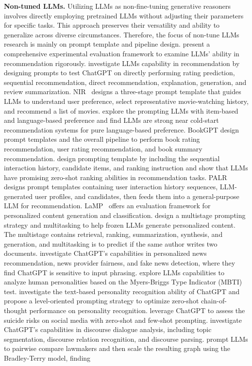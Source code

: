 \documentclass[11pt]{article}
\renewcommand\paragraph[1]{\vspace{0.05in} \noindent \textbf{#1.}}
\begin{document}
\paragraph{Non-tuned LLMs}
Utilizing LLMs as non-fine-tuning generative reasoners involves directly employing pretrained LLMs without adjusting their parameters for specific tasks. This approach preserves their versatility and ability to generalize across diverse circumstances. Therefore, the focus of non-tune LLMs research is mainly on prompt template and pipeline design.
\citet{di2023evaluating} present a comprehensive experimental evaluation framework to examine LLMs' ability in recommendation rigorously. \citet{liu2023chatgpt} investigate LLMs capability in recommendation by designing prompts to test ChatGPT on directly performing rating prediction, sequential recommendation, direct recommendation, explanation, generation, and review summarization. NIR~\cite{wang2023zero} designs a three-stage prompt template that guides LLMs to understand user preference, select representative movie-watching history, and recommend a list of movies. \citet{sanner2023large} explore the prompting LLMs with item-based and language-based preference and find LLMs are strong near cold-start recommendation systems for pure language-based preference. BookGPT \cite{zhiyuli2023bookgpt} design prompt templates and the overall pipeline to perform book rating recommendation, user rating recommendation, and book summary recommendation. \citet{hou2023large} design prompting template by including the sequential interaction history, candidate items, and ranking instruction and show that LLMs have promising zero-shot ranking abilities in recommendation tasks. PALR~\cite{chen2023palr} designs prompt templates containing user interaction history sequences, LLM-generated user profiles, and candidates, then feeds them into a general-purpose LLM for recommendation. LaMP~\cite{salemi2023lamp} offers an evaluation framework for personalized content generation and classification. \citet{li2023teach} design a multistage prompting strategy and multitasking to help frozen LLMs generate personalized content. The multistage contains retrieval, ranking, summarization, synthesis, and generation, and multitasking is to predict if the same author writes two documents. \citet{li2023preliminary} investigate ChatGPT's capabilities in personalized news recommendation, news provider fairness, and fake news detection, where they find ChatGPT is sensitive to input phrasing. \citet{rao2023can} explore LLMs capabilities to analyze human personalities based on the Myers-Briggs Type Indicator (MBTI) test. \citet{ji2023chatgpt} investigate the text-based personality recognition ability of ChatGPT and propose a level-oriented prompting strategy to optimize zero-shot chain-of-thought performance on personality recognition. \citet{ghanadian2023chatgpt} leverage ChatGPT to assess the suicide risks on social media with zero-shot and few-shot prompting. \citet{fan2023uncovering} investigate ChatGPT's capabilities in discourse dialogue analysis, including topic segmentation, discourse relation recognition, and discourse parsing. \citet{wu2023large} prompt LLMs to pairwise compare lawmakers and then scale the resulting graph using the Bradley-Terry model, finding 
\end{document}
